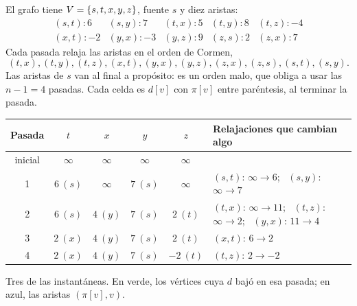 \documentclass[11pt,letterpaper]{article}
\begin{document}
\begin{ejemplo}
  \label{ej:bellman-ford-24-4}
  El grafo tiene $V = \left\{ s, t, x, y, z \right\}$, fuente $s$ y diez aristas:
  \[
    \begin{array}{lllll}
      (s, t) : 6 & (s, y) : 7 & (t, x) : 5 & (t, y) : 8
        & (t, z) : -4 \\
      (x, t) : -2 & (y, x) : -3 & (y, z) : 9 & (z, s) : 2
        & (z, x) : 7
    \end{array}
  \]
  Cada pasada relaja las aristas en el orden de Cormen,
  \[
    (t, x), (t, y), (t, z), (x, t), (y, x), (y, z), (z, x), (z, s),
    (s, t), (s, y) .
  \]
  Las aristas de $s$ van al final a propósito: es un orden malo, que
  obliga a usar las $n - 1 = 4$ pasadas. Cada celda es $d[v]$ con
  $\pi[v]$ entre paréntesis, al terminar la pasada.
  \begin{center}
  \small
  \begin{tabular}{cccccl}
    \toprule
    \textbf{Pasada} & $t$ & $x$ & $y$ & $z$
      & \textbf{Relajaciones que cambian algo} \\
    \midrule
    inicial & $\infty$ & $\infty$ & $\infty$ & $\infty$ & \\
    1 & $6\ (s)$ & $\infty$ & $7\ (s)$ & $\infty$
      & $(s, t)$: $\infty \to 6$; \ $(s, y)$: $\infty \to 7$ \\
    2 & $6\ (s)$ & $4\ (y)$ & $7\ (s)$ & $2\ (t)$
      & $(t, x)$: $\infty \to 11$; \ $(t, z)$: $\infty \to 2$;
        \ $(y, x)$: $11 \to 4$ \\
    3 & $2\ (x)$ & $4\ (y)$ & $7\ (s)$ & $2\ (t)$
      & $(x, t)$: $6 \to 2$ \\
    4 & $2\ (x)$ & $4\ (y)$ & $7\ (s)$ & $-2\ (t)$
      & $(t, z)$: $2 \to -2$ \\
    \bottomrule
  \end{tabular}
  \end{center}
  Tres de las instantáneas. En verde, los vértices cuya $d$ bajó en
  esa pasada; en azul, las aristas $(\pi[v], v)$.
  \begin{center}
\end{center}
\end{ejemplo}
\end{document}
